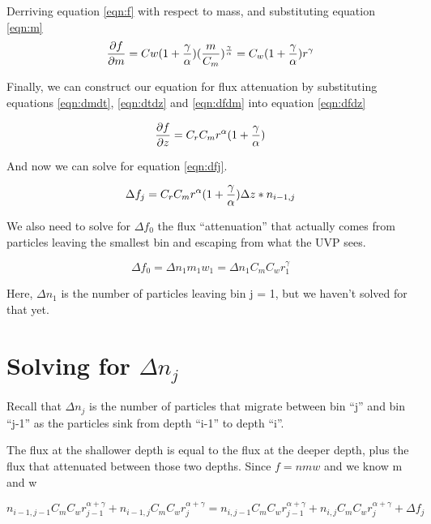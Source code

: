 \documentclass[a4paper,12pt]{article}
\begin{document}
Derriving equation \ref{eqn:f} with respect to mass, and substituting equation \ref{eqn:m}
\begin{equation}
{{\partial f} \over {\partial m}} = 
Cw(1+{\gamma \over \alpha}) ({m \over C_m}) ^ {\gamma \over \alpha}=
C_w(1+{\gamma \over \alpha}) r ^ \gamma
\label{eqn:dfdm}
\end{equation}

Finally, we can construct our equation for flux attenuation by substituting equations \ref{eqn:dmdt}, \ref{eqn:dtdz} and \ref{eqn:dfdm} into equation \ref{eqn:dfdz}

\begin{equation}
{{\partial f} \over {\partial z}} = C_r C_m r^\alpha(1+{\gamma \over \alpha})
\end{equation}


And now we can solve for equation \ref{eqn:dfj}.

\begin{equation}
\Delta f_j = C_r C_m r^\alpha (1+{\gamma \over \alpha}) \Delta z * n_{i-1,j}
\label{eqn:dfj}
\end{equation}

We also need to solve for $\Delta f_0$ the flux ``attenuation'' that actually comes from particles leaving the smallest bin and escaping from what the UVP sees.

\begin{equation}
\Delta f_0 = \Delta n_1 m_1 w_1 =  \Delta n_1 C_m C_w r_1^\gamma
\label{eqn:df0}
\end{equation}

Here, $\Delta n_1$ is the number of particles leaving bin j = 1, but we haven't solved for that yet.

\section{Solving for $\Delta n_j$}

Recall that $\Delta n_j$ is the number of particles that migrate between bin ``j'' and bin ``j-1'' as the particles sink from depth ``i-1'' to depth ``i''.

The flux at the shallower depth is equal to the flux at the deeper depth, plus the flux that attenuated between those two depths. Since $f = nmw$ and we know m and w

\begin{equation}
n_{i-1,j-1} C_m C_w r_{j-1}^{\alpha + \gamma} + n_{i-1,j} C_m C_w r_{j}^{\alpha + \gamma} =
n_{i,j-1} C_m C_w r_{j-1}^{\alpha + \gamma} + n_{i,j} C_m C_w r_{j}^{\alpha + \gamma} + \Delta f_j
\label{eqn:n4f}
\end{equation}
\end{document}
